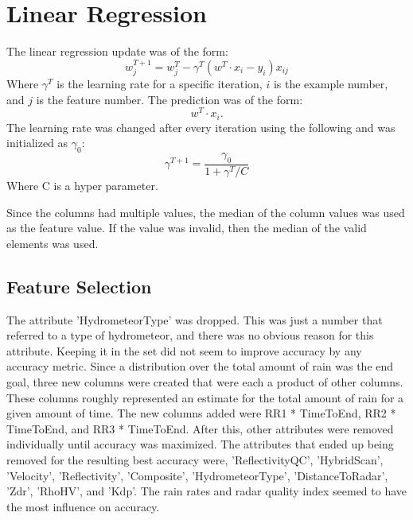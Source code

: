 \documentclass[pdftex,a4paper,11pt]{article}
\begin{document}
\section{Linear Regression}
The linear regression update \cite{seber2012linear} was of the form:
$$w^{T + 1}_j = w^{T}_j - \gamma^T(w^{T} \cdot x_{i} - y_i)x_{ij}$$
Where $\gamma^T$ is the learning rate for a specific iteration, $i$ is the example number, and $j$ is the feature number. The prediction was of the form:
$$w^{T} \cdot x_{i}.$$
The learning rate was changed after every iteration using the following and was initialized as $\gamma_0$:
$$\gamma^{T + 1} = \frac{\gamma_{0}}{1 + \gamma^{T} / C}$$
Where C is a hyper parameter.




Since the columns had multiple values, the median of the column values was used as the feature value. If the value was invalid, then the median of the valid elements was used.
\subsection{Feature Selection}
The attribute 'HydrometeorType' was dropped. This was just a number that referred to a type of hydrometeor, and there was no obvious reason for this attribute. Keeping it in the set did not seem to improve accuracy by any accuracy metric. Since a distribution over the total amount of rain was the end goal, three new columns were created that were each a product of other columns. These columns roughly represented an estimate for the total amount of rain for a given amount of time. The new columns added were RR1 * TimeToEnd, RR2 * TimeToEnd, and RR3 * TimeToEnd. After this, other attributes were removed individually until accuracy was maximized. The attributes that ended up being removed for the resulting best accuracy were, 'ReflectivityQC', 'HybridScan', 'Velocity', 'Reflectivity', 'Composite', 'HydrometeorType', 'DistanceToRadar', 'Zdr', 'RhoHV', and 'Kdp'. The rain rates and radar quality index seemed to have the most influence on accuracy.
\end{document}
